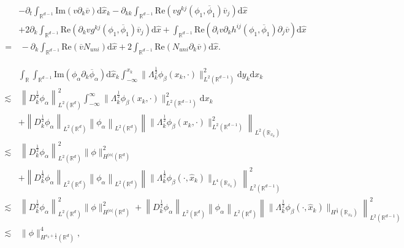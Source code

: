 \documentclass[10pt,a4paper]{amsart}
\begin{document}
 	\begin{align} \label{consm1-2}
 		&	-\partial_t \int_{\mathbb{R}^{d-1}}  \mathrm{Im}\left(v \partial_k \overline{v} \right) \mathrm{d} \hat{x}_k-\partial_{kk} \int_{\mathbb{R}^{d-1}} \mathrm{Re}\left( v   g^{kj} \left(\phi_1,\overline{\phi}_1\right) \overline{v}_{ j}\right) \mathrm{d} \hat{x}\nonumber\\
 		&+2 \partial_k \int_{\mathbb{R}^{d-1}} \mathrm{Re}\left(\partial_k v  g^{kj} \left(\phi_1,\overline{\phi}_1\right) \overline{v}_{  j}\right) \mathrm{d} \hat{x} + \int_{\mathbb{R}^{d-1}}  \mathrm{Re}\left(\partial_{i} v \partial_k h^{ij} \left(\phi_1,\overline{\phi}_1\right) \partial_j \overline{v} \right)  \mathrm{d} \hat{x} \\
 		=&\,- \partial_k\int_{\mathbb{R}^{d-1}}   \mathrm{Re}\left( \overline{v}  N_{uni} \right)\mathrm{d} \hat{x}+2\int_{\mathbb{R}^{d-1}} \mathrm{Re} \left( N_{uni} \partial_k \overline{ v} \right)   \mathrm{d} \hat{x}. \nonumber
 	\end{align}

\begin{align} \label{cener_c1_4_1}
	&\int_{\mathbb{R}}  \int_{\mathbb{R}^{d-1}}  \mathrm{Im}\left( \phi_{\alpha } \partial_k \overline{\phi}_\alpha \right) \mathrm{d} \hat{x}_k \int_{-\infty}^{x_k} \|\Lambda_k^{\frac 12}\phi_{\beta}(x_k,\cdot)\|^2_{L^2(\mathbb{R}^{d-1})} \mathrm{d} y_k  \mathrm{d} x_k \nonumber\\
	\lesssim &\,\left\|   D_k^{\frac 12}\phi_\alpha\right\|_{L^2(\mathbb{R}^d)}^2 \int_{-\infty}^{\infty} \|\Lambda_k^{\frac 12}\phi_{\beta}(x_k,\cdot)\|^2_{L^2(\mathbb{R}^{d-1})}\mathrm{d} x_k\nonumber\\
	&+\left\|   D_k^{\frac 12}\phi_{\alpha}\right\|_{L^2(\mathbb{R}^d)} \left\|   \phi_{\alpha}\right\|_{L^2(\mathbb{R}^d)} \left\| \|\Lambda_k^{\frac 12}\phi_{\beta}(x_k,\cdot)\|^2_{L^2(\mathbb{R}^{d-1})}\right\|_{L^2(\mathbb{R}_{x_k})}\\
	\lesssim &\,\left\|   D_k^{\frac 12}\phi_\alpha\right\|_{L^2(\mathbb{R}^d)}^2 \|\phi\|_{H^{|\alpha|}(\mathbb{R}^d)}^2\nonumber\\
	&+\left\|   D_k^{\frac 12}\phi_{\alpha}\right\|_{L^2(\mathbb{R}^d)} \left\|   \phi_{\alpha}\right\|_{L^2(\mathbb{R}^d)}\left\| \|\Lambda_k^{\frac 12}\phi_{\beta}(\cdot,\hat{x}_k)\|_{L^4(\mathbb{R}_{x_k})} \right\|_{L^{2}(\mathbb{R}^{d-1})}^2\nonumber\\
	\lesssim &\,\left\|   D_k^{\frac 12}\phi_\alpha\right\|_{L^2(\mathbb{R}^d)}^2 \|\phi\|_{H^{|\alpha|}(\mathbb{R}^d)}^2\nonumber+\left\|   D_k^{\frac 12}\phi_{\alpha}\right\|_{L^2(\mathbb{R}^d)} \left\|   \phi_{\alpha}\right\|_{L^2(\mathbb{R}^d)}\left\| \|\Lambda_k^{\frac 12}\phi_{\beta}(\cdot,\hat{x}_k)\|_{H^{\frac14}(\mathbb{R}_{x_k})} \right\|_{L^{2}(\mathbb{R}^{d-1})}^2\nonumber\\
	\lesssim &\,\|\phi\|^4_{H^{s_3+\frac 12}(\mathbb{R}^{d})},\nonumber
\end{align}
\end{document}
